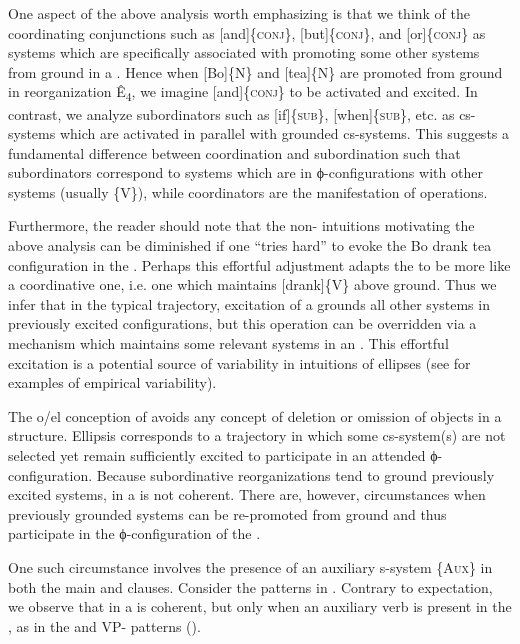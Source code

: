   One aspect of the above analysis worth emphasizing is that we think of the coordinating conjunctions such as [and]\{\textsc{conj}\}, [but]\{\textsc{conj}\}, and [or]\{\textsc{conj}\} as systems which are specifically associated with promoting some other systems from ground in a . Hence when [Bo]\{N\} and [tea]\{N\} are promoted from ground in reorganization Ê\textsubscript{4}, we imagine [and]\{\textsc{conj}\} to be activated and excited. In contrast, we analyze subordinators such as [if]\{\textsc{sub}\}, [when]\{\textsc{sub}\}, etc. as cs-systems which are activated in parallel with grounded cs-systems. This suggests a fundamental difference between coordination and subordination such that subordinators correspond to systems which are in ϕ-configurations with other systems (usually \{V\}), while coordinators are the manifestation of  operations.

  Furthermore, the reader should note that the non- intuitions motivating the above analysis can be diminished if one “tries hard” to evoke the {\textbar}Bo drank tea{\textbar} configuration in the . Perhaps this effortful adjustment adapts the  to be more like a coordinative one, i.e. one which maintains [drank]\{V\} above ground. Thus we infer that in the typical  trajectory, excitation of a  grounds all other systems in previously excited configurations, but this operation can be overridden via a mechanism which maintains some relevant systems in an . This effortful excitation is a potential source of variability in  intuitions of ellipses (see \citealt{FrazierClifton2005,Phillips2003,PhillipsParker2014} for examples of empirical variability). 

  The o/el conception of  avoids any concept of deletion or omission of objects in a structure. Ellipsis corresponds to a trajectory in which some cs-system(s) are not selected yet remain sufficiently excited to participate in an attended ϕ-configuration. Because subordinative reorganizations tend to ground previously excited systems,  in a  is not coherent. There are, however, circumstances when previously grounded systems can be re-promoted from ground and thus participate in the ϕ-configuration of the . 

  One such circumstance involves the presence of an auxiliary s-system \{A\textsc{ux}\} in both the main and  clauses. Consider the patterns in {}. Contrary to expectation, we observe that  in a  is coherent, but only when an auxiliary verb is present in the , as in the  and VP- patterns (\citealt{Johnson2001,Johnson2009,Merchant2001}).

